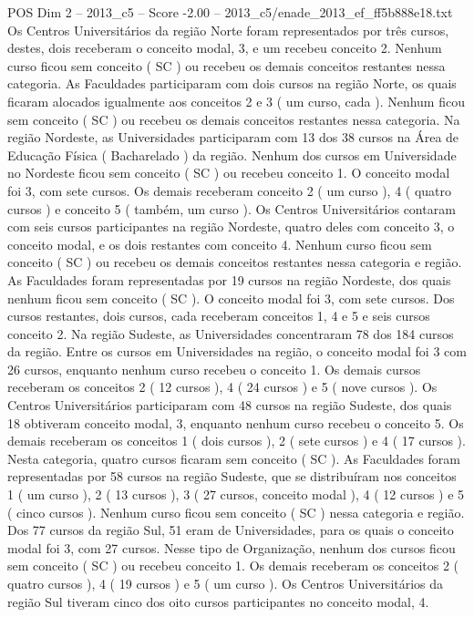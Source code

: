 \begin{textsample}{POS Dim 2 – 2013\_c5 – Score -2.00 – 2013\_c5/enade\_2013\_ef\_ff5b888e18.txt}
Os Centros Universitários da região Norte foram representados por três cursos, destes, dois receberam o conceito modal, 3, e um recebeu conceito 2.
Nenhum curso ficou sem conceito ( SC ) ou recebeu os demais conceitos restantes nessa categoria.
As Faculdades participaram com dois cursos na região Norte, os quais ficaram alocados igualmente aos conceitos 2 e 3 ( um curso, cada ).
Nenhum ficou sem conceito ( SC ) ou recebeu os demais conceitos restantes nessa categoria.
Na região Nordeste, as Universidades participaram com 13 dos 38 cursos na Área de Educação Física ( Bacharelado ) da região.
Nenhum dos cursos em Universidade no Nordeste ficou sem conceito ( SC ) ou recebeu conceito 1.
O conceito modal foi 3, com sete cursos.
Os demais receberam conceito 2 ( um curso ), 4 ( quatro cursos ) e conceito 5 ( também, um curso ).
Os Centros Universitários contaram com seis cursos participantes na região Nordeste, quatro deles com conceito 3, o conceito modal, e os dois restantes com conceito 4.
Nenhum curso ficou sem conceito ( SC ) ou recebeu os demais conceitos restantes nessa categoria e região.
As Faculdades foram representadas por 19 cursos na região Nordeste, dos quais nenhum ficou sem conceito ( SC ).
O conceito modal foi 3, com sete cursos.
Dos cursos restantes, dois cursos, cada receberam conceitos 1, 4 e 5 e seis cursos conceito 2.
Na região Sudeste, as Universidades concentraram 78 dos 184 cursos da região.
Entre os cursos em Universidades na região, o conceito modal foi 3 com 26 cursos, enquanto nenhum curso recebeu o conceito 1.
Os demais cursos receberam os conceitos 2 ( 12 cursos ), 4 ( 24 cursos ) e 5 ( nove cursos ).
Os Centros Universitários participaram com 48 cursos na região Sudeste, dos quais 18 obtiveram conceito modal, 3, enquanto nenhum curso recebeu o conceito 5.
Os demais receberam os conceitos 1 ( dois cursos ), 2 ( sete cursos ) e 4 ( 17 cursos ).
Nesta categoria, quatro cursos ficaram sem conceito ( SC ).
As Faculdades foram representadas por 58 cursos na região Sudeste, que se distribuíram nos conceitos 1 ( um curso ), 2 ( 13 cursos ), 3 ( 27 cursos, conceito modal ), 4 ( 12 cursos ) e 5 ( cinco cursos ).
Nenhum curso ficou sem conceito ( SC ) nessa categoria e região.
Dos 77 cursos da região Sul, 51 eram de Universidades, para os quais o conceito modal foi 3, com 27 cursos.
Nesse tipo de Organização, nenhum dos cursos ficou sem conceito ( SC ) ou recebeu conceito 1.
Os demais receberam os conceitos 2 ( quatro cursos ), 4 ( 19 cursos ) e 5 ( um curso ).
Os Centros Universitários da região Sul tiveram cinco dos oito cursos participantes no conceito modal, 4.

\end{textsample}
